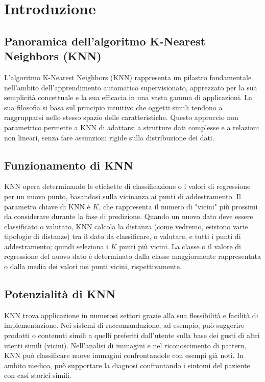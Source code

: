 
\section{Introduzione}

\subsection{Panoramica dell'algoritmo K-Nearest Neighbors (KNN)}
L'algoritmo K-Nearest Neighbors (KNN) rappresenta un pilastro fondamentale 
nell'ambito dell'apprendimento automatico supervisionato, apprezzato per la 
sua semplicità concettuale e la sua efficacia in una vasta gamma di applicazioni. 
La sua filosofia si basa sul principio intuitivo che oggetti simili tendono a 
raggrupparsi nello stesso spazio delle caratteristiche. Questo approccio non 
parametrico permette a KNN di adattarsi a strutture dati complesse e 
a relazioni non lineari, senza fare assunzioni rigide sulla distribuzione dei dati.

\subsection{Funzionamento di KNN}

KNN opera determinando le etichette di classificazione o i valori di 
regressione per un nuovo punto, basandosi sulla vicinanza ai punti di addestramento. 
Il parametro chiave di KNN è $K$, che rappresenta il numero di "vicini" più prossimi 
da considerare durante la fase di predizione. Quando un nuovo dato deve essere 
classificato o valutato, KNN calcola la distanza (come vedremo, esistono varie tipologie di distanze) 
tra il dato da classificare, o valutare, e tutti i punti di addestramento;
quindi seleziona i $K$ punti più vicini. La classe o 
il valore di regressione del nuovo dato è determinato dalla classe maggiormente rappresentata
o dalla media dei valori nei punti vicini, rispettivamente.

\subsection{Potenzialità di KNN}

KNN trova applicazione in numerosi settori grazie alla sua flessibilità e facilità di 
implementazione. Nei sistemi di raccomandazione, ad esempio, può suggerire prodotti o 
contenuti simili a quelli preferiti dall'utente sulla base dei gusti di altri utenti simili 
(vicini). Nell'analisi di immagini e nel riconoscimento di pattern, KNN può classificare 
nuove immagini confrontandole con esempi già noti. In ambito medico, può supportare la diagnosi 
confrontando i sintomi del paziente con casi storici simili.

